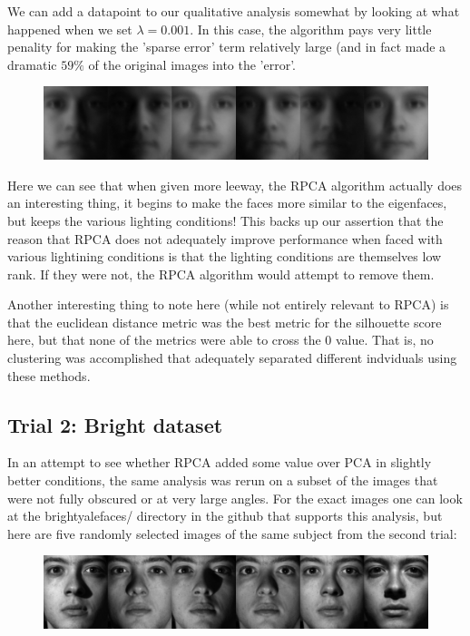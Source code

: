 \documentclass[11pt]{scrartcl} %
\theoremstyle{plain}
\begin{document}
We can add a datapoint to our qualitative analysis somewhat by looking at what happened when we set $\lambda = 0.001$. In this case, the algorithm pays very little penality for making the 'sparse error' term relatively large (and in fact made a dramatic $59\%$ of the original images into the 'error'.

\begin{figure}[H]
\includegraphics[width=\textwidth]{figures/person24Afterl=0dot001RPCAtrial1.jpg} 
\centering
\end{figure}

Here we can see that when given more leeway, the RPCA algorithm actually does an interesting thing, it begins to make the faces more similar to the eigenfaces, but keeps the various lighting conditions! This backs up our assertion that the reason that RPCA does not adequately improve performance when faced with various lightining conditions is that the lighting conditions are themselves low rank. If they were not, the RPCA algorithm would attempt to remove them.

Another interesting thing to note here (while not entirely relevant to RPCA) is that the euclidean distance metric was the best metric for the silhouette score here, but that none of the metrics were able to cross the 0 value. That is, no clustering was accomplished that adequately separated different indviduals using these methods.

\subsection{Trial 2: Bright dataset}

In an attempt to see whether RPCA added some value over PCA in slightly better conditions, the same analysis was rerun on a subset of the images that were not fully obscured or at very large angles. For the exact images one can look at the brightyalefaces/ directory in the github that supports this analysis, but here are five randomly selected images of the same subject from the second trial:

\begin{figure}[H]
\includegraphics[width=\textwidth]{figures/person24trial2.jpg} 
\centering
\end{figure}
\end{document}
